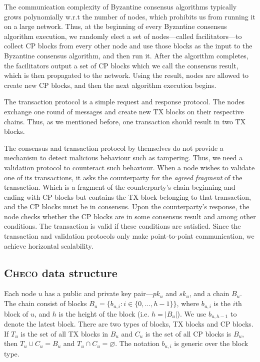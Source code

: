 The communication complexity of Byzantine consensus algorithms typically grows polynomially w.r.t the number of nodes,
which prohibits us from running it on a large network.
Thus, at the beginning of every Byzantine consensus algorithm execution,
we randomly elect a set of nodes---called facilitators---to collect CP blocks from every other node and use those blocks as the input to the Byzantine consensus algorithm, and then run it.
After the algorithm completes,
the facilitators output a set of CP blocks which we call the consensus result,
which is then propagated to the network.
Using the result, nodes are allowed to create new CP blocks,
and then the next algorithm execution begins.

The transaction protocol is a simple request and response protocol.
The nodes exchange one round of messages and create new TX blocks on their respective chains.
Thus, as we mentioned before, one transaction should result in two TX blocks.

The consensus and transaction protocol by themselves do not provide a mechanism to detect malicious behaviour such as tampering.
Thus, we need a validation protocol to counteract such behaviour.
When a node wishes to validate one of its transactions, it asks the counterparty for the \emph{agreed fragment} of the transaction.
Which is a fragment of the counterparty's chain beginning and ending with CP blocks but contains the TX block belonging to that transaction,
and the CP blocks must be in consensus.
Upon the counterparty's response,
the node checks whether the CP blocks are in some consensus result and among other conditions.
The transaction is valid if these conditions are satisfied.
Since the transaction and validation protocols only make point-to-point communication,
we achieve horizontal scalability.

\subsection{\textsc{Checo} data structure}
Each node $u$ has a public and private key pair---$pk_u$ and $sk_u$, and a chain $B_u$.
The chain consist of blocks $B_u = \{ b_{u, i} : i \in \{ 0, \dots, h - 1 \} \}$,
where $b_{u, i}$ is the $i$th block of $u$,
and $h$ is the height of the block (i.e. $h = |B_u|$).
We use $b_{u, h-1}$ to denote the latest block.
There are two types of blocks, TX blocks and CP blocks.
If $T_u$ is the set of all TX blocks in $B_u$ and $C_u$ is the set of all CP blocks is $B_u$,
then $T_u \cup C_u = B_u$ and $T_u \cap C_u = \varnothing$.
The notation $b_{u, i}$ is generic over the block type.

